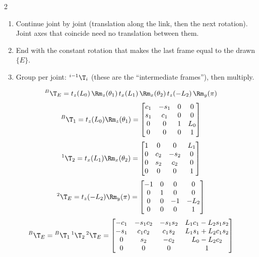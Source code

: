 \begin{multicols}{2}
\begin{recipe}
\begin{enumerate}
\item Continue joint by joint (translation along the link, then the next rotation). Joint axes that coincide need no translation between them.
\item End with the constant rotation that makes the last frame equal to the drawn $\{E\}$.
\item Group per joint: ${}^{i-1}\T_i$ (these are the ``intermediate frames''), then multiply.
\end{enumerate}
\end{recipe}

\columnbreak
{}
\begin{minipage}[t]{0.49\linewidth}\end{minipage}\hfill
\begin{minipage}[t]{0.49\linewidth}\end{minipage}
\begin{fbx}
\[{}^B\T_E=t_z(L_0)\,\Rm_z(\theta_1)\,t_x(L_1)\,\Rm_x(\theta_2)\,t_z(-L_2)\,\Rm_y(\pi)\]
\[{}^B\T_1=t_z(L_0)\Rm_z(\theta_1)=\begin{bmatrix}c_1&-s_1&0&0\\s_1&c_1&0&0\\0&0&1&L_0\\0&0&0&1\end{bmatrix}\]
\[{}^1\T_2=t_x(L_1)\Rm_x(\theta_2)=\begin{bmatrix}1&0&0&L_1\\0&c_2&-s_2&0\\0&s_2&c_2&0\\0&0&0&1\end{bmatrix}\]
\[{}^2\T_E=t_z(-L_2)\Rm_y(\pi)=\begin{bmatrix}-1&0&0&0\\0&1&0&0\\0&0&-1&-L_2\\0&0&0&1\end{bmatrix}\]
\[{}^B\T_E={}^B\T_1\,{}^1\T_2\,{}^2\T_E=\begin{bmatrix}-c_1&-s_1c_2&-s_1s_2&L_1c_1-L_2s_1s_2\\-s_1&c_1c_2&c_1s_2&L_1s_1+L_2c_1s_2\\0&s_2&-c_2&L_0-L_2c_2\\0&0&0&1\end{bmatrix}\]

\end{fbx}
\end{multicols}
